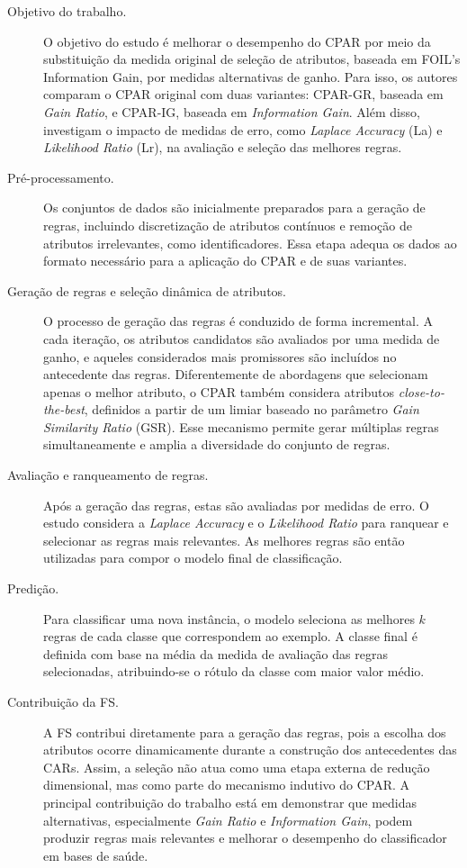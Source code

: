\begin{description}
    \item[Objetivo do trabalho.] O objetivo do estudo é melhorar o desempenho do CPAR por meio da substituição da medida original de seleção de atributos, baseada em FOIL's Information Gain, por medidas alternativas de ganho. Para isso, os autores comparam o CPAR original com duas variantes: CPAR-GR, baseada em \textit{Gain Ratio}, e CPAR-IG, baseada em \textit{Information Gain}. Além disso, investigam o impacto de medidas de erro, como \textit{Laplace Accuracy} (La) e \textit{Likelihood Ratio} (Lr), na avaliação e seleção das melhores regras.

    \item[Pré-processamento.] Os conjuntos de dados são inicialmente preparados para a geração de regras, incluindo discretização de atributos contínuos e remoção de atributos irrelevantes, como identificadores. Essa etapa adequa os dados ao formato necessário para a aplicação do CPAR e de suas variantes.

    \item[Geração de regras e seleção dinâmica de atributos.] O processo de geração das regras é conduzido de forma incremental. A cada iteração, os atributos candidatos são avaliados por uma medida de ganho, e aqueles considerados mais promissores são incluídos no antecedente das regras. Diferentemente de abordagens que selecionam apenas o melhor atributo, o CPAR também considera atributos \textit{close-to-the-best}, definidos a partir de um limiar baseado no parâmetro \textit{Gain Similarity Ratio} (GSR). Esse mecanismo permite gerar múltiplas regras simultaneamente e amplia a diversidade do conjunto de regras.

    \item[Avaliação e ranqueamento de regras.] Após a geração das regras, estas são avaliadas por medidas de erro. O estudo considera a \textit{Laplace Accuracy} e o \textit{Likelihood Ratio} para ranquear e selecionar as regras mais relevantes. As melhores regras são então utilizadas para compor o modelo final de classificação.

    \item[Predição.] Para classificar uma nova instância, o modelo seleciona as melhores $k$ regras de cada classe que correspondem ao exemplo. A classe final é definida com base na média da medida de avaliação das regras selecionadas, atribuindo-se o rótulo da classe com maior valor médio.

    \item[Contribuição da FS.] A FS contribui diretamente para a geração das regras, pois a escolha dos atributos ocorre dinamicamente durante a construção dos antecedentes das CARs. Assim, a seleção não atua como uma etapa externa de redução dimensional, mas como parte do mecanismo indutivo do CPAR. A principal contribuição do trabalho está em demonstrar que medidas alternativas, especialmente \textit{Gain Ratio} e \textit{Information Gain}, podem produzir regras mais relevantes e melhorar o desempenho do classificador em bases de saúde.


\end{description}
